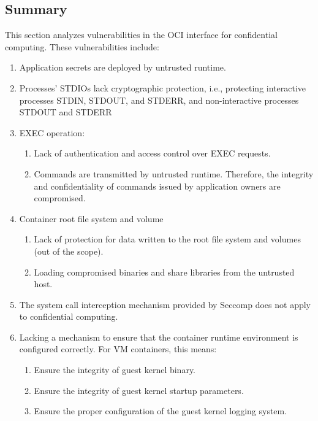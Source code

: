 \subsection{Summary}
\label{sec:security_analyse_oci_summary}
This section analyzes vulnerabilities in the OCI interface for confidential computing. These vulnerabilities include:
 \begin{enumerate}
  \item\label{vulnerability:1} Application secrets are deployed by untrusted runtime.
  \item\label{vulnerabilities:2} Processes' STDIOs lack cryptographic protection, i.e., protecting interactive processes STDIN, STDOUT, and STDERR, and non-interactive processes STDOUT and STDERR
  \item\label{vulnerabilities:3}EXEC operation:
      \begin{enumerate}
        \item Lack of authentication and access control over EXEC requests.
        \item Commands are transmitted by untrusted runtime. Therefore, the integrity and confidentiality of commands issued by application owners are compromised.
      \end{enumerate}
  \item\label{vulnerabilities:4} Container root file system and volume
      \begin{enumerate}
        \item Lack of protection for data written to the root file system and volumes (out of the scope).
        \item Loading compromised binaries and share libraries from the untrusted host.
      \end{enumerate}
  \item\label{vulnerabilities:5} The system call interception mechanism provided by Seccomp does not apply to confidential computing.
  \item\label{vulnerabilities:6} Lacking a mechanism to ensure that the container runtime environment is configured correctly. For VM containers, this means:
      \begin{enumerate}
        \item Ensure the integrity of guest kernel binary.
        \item\label{vulnerabilities:10} Ensure the integrity of guest kernel startup parameters.
        \item\label{vulnerabilities:11} Ensure the proper configuration of the guest kernel logging system.
      \end{enumerate}
\end{enumerate}


